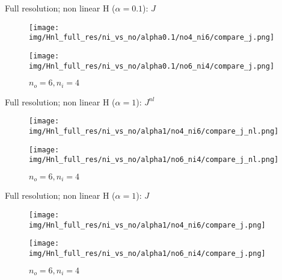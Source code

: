 \documentclass[francais]{beamer}
\begin{document}
\begin{frame}{Full resolution; non linear H ($\alpha = 0.1$): $J$}
\begin{center}
\begin{figure}
  \texttt{[image: img/Hnl\_full\_res/ni\_vs\_no/alpha0.1/no4\_ni6/compare\_j.png]}
  \caption{$n_o = 4, n_i = 6$}
\endminipage\hfill
{}
  \texttt{[image: img/Hnl\_full\_res/ni\_vs\_no/alpha0.1/no6\_ni4/compare\_j.png]}
  \caption{$n_o = 6, n_i = 4$}
\endminipage
\end{figure}
\end{center}
\end{frame}


\begin{frame}{Full resolution; non linear H ($\alpha = 1$): $J^{nl}$}
\begin{center}
\begin{figure}
  \texttt{[image: img/Hnl\_full\_res/ni\_vs\_no/alpha1/no4\_ni6/compare\_j\_nl.png]}
  \caption{$n_o = 4, n_i = 6$}
\endminipage\hfill
{}
  \texttt{[image: img/Hnl\_full\_res/ni\_vs\_no/alpha1/no6\_ni4/compare\_j\_nl.png]}
  \caption{$n_o = 6, n_i = 4$}
\endminipage
\end{figure}
\end{center}
\end{frame}

\begin{frame}{Full resolution; non linear H ($\alpha = 1$): $J$}
\begin{center}
\begin{figure}
  \texttt{[image: img/Hnl\_full\_res/ni\_vs\_no/alpha1/no4\_ni6/compare\_j.png]}
  \caption{$n_o = 4, n_i = 6$}
\endminipage\hfill
{}
  \texttt{[image: img/Hnl\_full\_res/ni\_vs\_no/alpha1/no6\_ni4/compare\_j.png]}
  \caption{$n_o = 6, n_i = 4$}
\endminipage
\end{figure}
\end{center}
\end{frame}
\end{document}
